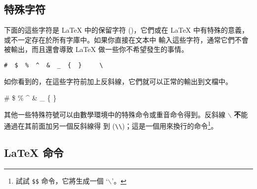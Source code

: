 \subsection{特殊字符}


下面的這些字符是 \LaTeX{} 中的保留字符 ()，它們或在 \LaTeX{} 中有特殊的意義，或不一定存在於所有字庫中。如果你直接在文本中
輸入這些字符，通常它們不會被輸出，而且還會導致 \LaTeX{} 做一些你不希望發生的事情。
\begin{code}
\verb.#  $  %  ^  &  _  {  }     \ . %
\end{code}


如你看到的，在這些字符前加上反斜線，它們就可以正常的輸出到文檔中。

\begin{example}
\# \$ \% \^{} \& \_ \{ \} \ {}
\end{example}


其他一些特殊符號可以由數學環境中的特殊命令或重音命令得到。反斜線 $\backslash$ {\textbf
不}能通過在其前面加另一個反斜線得
到 (\verb|\\|)；這是一個用來換行的命令\footnote{試試 \texttt{\$}\texttt{\$} 命令，它將生成一個 `$\backslash$'。}。

\subsection{\LaTeX{} 命令}

